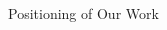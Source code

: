 \begin{frame}{Positioning of Our Work}
\begin{adjustbox}{max totalsize={.9\textwidth}{.9\textheight},center}
    \centering
    
\end{adjustbox}
\end{frame}